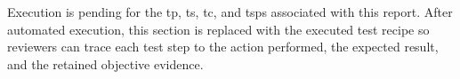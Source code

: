 Execution is pending for the \gls{tp}, \gls{ts}, \gls{tc}, and \glspl{tsp}
associated with this report.  After automated execution, this section is
replaced with the executed test recipe so reviewers can trace each test step to
the action performed, the expected result, and the retained objective evidence.
